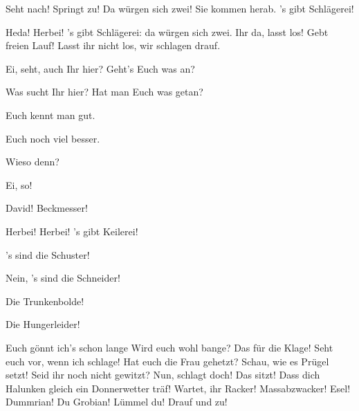 \begin{drama}


Seht nach! Springt zu!
Da würgen sich zwei!
Sie kommen herab.
's gibt Schlägerei!



Heda! Herbei! 's gibt Schlägerei:
da würgen sich zwei.
Ihr da, lasst los! Gebt freien Lauf!
Lasst ihr nicht los, wir schlagen drauf.

Ei, seht, auch Ihr hier?
Geht's Euch was an?

Was sucht Ihr hier?
Hat man Euch was getan?

Euch kennt man gut.

Euch noch viel besser.

Wieso denn?



Ei, so!

\Magdalenespeaks


David! Beckmesser!



Herbei! Herbei! 's gibt Keilerei!



's sind die Schuster!



Nein, 's sind die Schneider!

Die Trunkenbolde!

Die Hungerleider!



Euch gönnt ich's schon lange
Wird euch wohl bange?
Das für die Klage!
Seht euch vor, wenn ich schlage!
Hat euch die Frau gehetzt?
Schau, wie es Prügel setzt!
Seid ihr noch nicht gewitzt?
Nun, schlagt doch! Das sitzt!
Dass dich Halunken
gleich ein Donnerwetter träf!
Wartet, ihr Racker!
Massabzwacker! 
Esel! Dummrian! 
Du Grobian! 
Lümmel du! 
Drauf und zu!



\end{drama}
